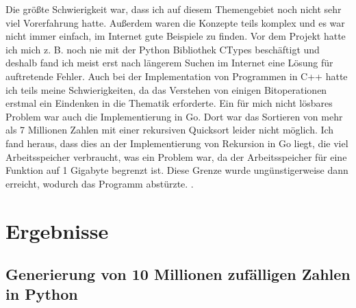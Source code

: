 \documentclass[11pt,a4paper]{article}
\begin{document}
Die größte Schwierigkeit war, dass ich auf diesem Themengebiet noch nicht sehr viel Vorerfahrung hatte.
Außerdem waren die Konzepte teils komplex und es war nicht immer einfach, im Internet gute Beispiele
zu finden. Vor dem Projekt hatte ich mich z. B. noch nie mit der Python Bibliothek CTypes beschäftigt
und deshalb fand ich meist erst nach längerem Suchen im Internet eine Lösung für auftretende Fehler.
Auch bei der Implementation von Programmen in C++ hatte ich teils meine Schwierigkeiten, da das Verstehen
von einigen Bitoperationen erstmal ein Eindenken in die Thematik erforderte.
Ein für mich nicht lösbares Problem war auch die Implementierung in Go.
Dort war das Sortieren von mehr als 7 Millionen Zahlen mit einer rekursiven Quicksort leider nicht möglich.
Ich fand heraus, dass dies an der Implementierung von Rekursion in Go liegt, die viel Arbeitsspeicher
verbraucht, was ein Problem war, da der Arbeitsspeicher für eine Funktion auf 1 Gigabyte begrenzt ist.
Diese Grenze wurde ungünstigerweise dann erreicht, wodurch das Programm abstürzte.
\cite{godeeprecursions} \cite{goroutinesize}.

\section{Ergebnisse}

\subsection{Generierung von 10 Millionen zufälligen Zahlen in Python}

\begin{bchart}[min=0, max=30, scale=1.9]
    \smallskip
    \smallskip
    \smallskip
    \smallskip
    \smallskip
\end{bchart}

\vspace{0.5cm}
\end{document}
